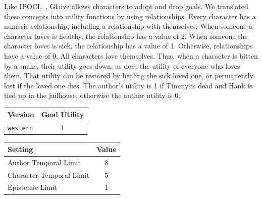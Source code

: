 \documentclass{nilreport}
\begin{document}
Like IPOCL~\cite{riedl2010narrative}, Glaive allows characters to
adopt and drop goals. We translated these concepts into utility functions
by using relationships. Every character has a numeric relationship,
including a relationship with themselves. When someone a character
loves is healthy, the relationship has a value of 2. When someone
the character loves is sick, the relationship has a value of 1. Otherwise,
relationships have a value of 0. All characters love themselves. Thus,
when a character is bitten by a snake, their utility goes down, as
does the utility of everyone who loves them. That utility can be restored
by healing the sick loved one, or permanently lost if the loved one
dies. The author's utility is 1 if Timmy is dead and Hank is tied
up in the jailhouse, otherwise the author utility is 0.

\medskip{}
\noindent{}

\medskip{}

\begin{center}
\begin{tabular}[t]{|l|c|}
\hline 
\textbf{Version} & \textbf{Goal Utility}\tabularnewline
\hline 
\hline 
\texttt{western} & 1\tabularnewline
\hline 
\end{tabular}\textbf{\quad{}}%
\begin{tabular}[t]{|l|c|}
\hline 
\textbf{Setting} & \textbf{Value}\tabularnewline
\hline 
\hline 
Author Temporal Limit & 8\tabularnewline
\hline 
Character Temporal Limit & 5\tabularnewline
\hline 
Epistemic Limit & 1\tabularnewline
\hline 
\end{tabular}
\par\end{center}
\end{document}
